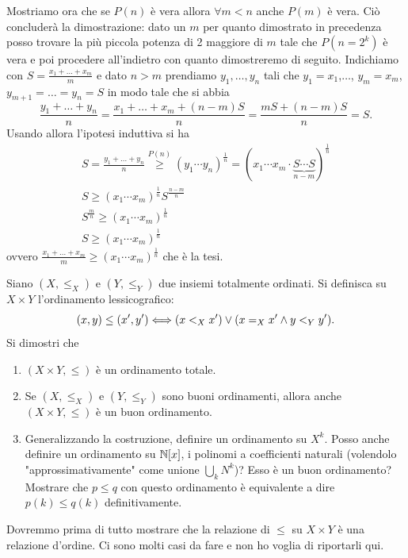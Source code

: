 \documentclass[a4paper]{article}\par \usepackage{style}\par
\begin{document}
\begin{enumerate}
\begin{pind}
    Mostriamo ora che se $ P(n) $ è vera allora $ \forall m < n $ anche $ P(m) $ è vera. Ciò concluderà la dimostrazione: dato un $ m $ per quanto dimostrato in precedenza posso trovare la più piccola potenza di 2 maggiore di $ m $ tale che $ P(n = 2^k) $ è vera e poi procedere all'indietro con quanto dimostreremo di seguito. Indichiamo con $ S = \frac{x_1 + \dots + x_m}{m} $ e dato $ n > m $ prendiamo $ y_1, \dots, y_n $ tali che $ y_1 = x_1 $,$ \dots $, $ y_m = x_m $, $ y_{m + 1} = \dots = y_n = S $ in modo tale che si abbia \[\frac{y_1 + \dots + y_n}{n} = \frac{x_1 + \dots + x_m + (n - m) S}{n} = \frac{m S + (n - m) S}{n} = S.\] Usando allora l'ipotesi induttiva si ha
    \begin{gather*}
      S = \frac{y_1 + \dots + y_n}{n} \overset{P(n)}{\geq} (y_1 \cdots y_n)^\frac{1}{n} = (x_1 \cdots x_m \cdot \underset{n - m}{\underbrace{S \cdots S}})^\frac{1}{n} \\
      S \geq (x_1 \cdots x_m)^\frac{1}{n} S^\frac{n - m}{n} \\
      S^\frac{m}{n} \geq (x_1 \cdots x_m)^\frac{1}{n} \\
      S \geq (x_1 \cdots x_m)^\frac{1}{n}
    \end{gather*}
    ovvero $ \frac{x_1 + \dots + x_m}{m} \geq (x_1 \cdots x_m)^\frac{1}{n} $ che è la tesi.
  \end{pind}
\end{enumerate}\par \begin{es}
  Siano $ (X, \leq_X) $ e $ (Y, \leq_Y) $ due insiemi totalmente ordinati. Si definisca su $ X \times Y $ l'ordinamento lessicografico: \[(x, y) \leq (x', y') \Longleftrightarrow (x <_X x') \vee (x =_X x' \wedge y <_Y y').\] Si dimostri che
  \begin{enumerate}
  \item $ (X \times Y, \leq) $ è un ordinamento totale.
  \item Se $ (X, \leq_X) $ e $ (Y, \leq_Y) $ sono buoni ordinamenti, allora anche $ (X \times Y, \leq) $ è un buon ordinamento.
  \item Generalizzando la costruzione, definire un ordinamento su $ X^k $. Posso anche definire un ordinamento su $ \mathbb{N}[x] $, i polinomi a coefficienti naturali (volendolo "approssimativamente" come unione $ \bigcup_{k} N^k $)? Esso è un buon ordinamento? Mostrare che $ p \leq q $ con questo ordinamento è equivalente a dire $ p(k) \leq q(k) $ definitivamente.
  \end{enumerate}
\end{es}\par Dovremmo prima di tutto mostrare che la relazione di $ \leq $ su $ X \times Y $ è una relazione d'ordine. Ci sono molti casi da fare e non ho voglia di riportarli qui.
\end{document}
